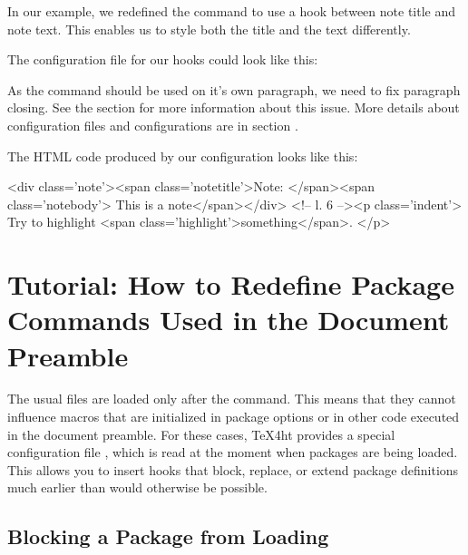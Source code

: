 In our example, we redefined the  command to use a hook between note title
and note text. This enables us to style both the title and the text differently.


The configuration file for our hooks could look like this:

\begin{texsource}
{\ifvmode\IgnorePar\fi\EndP{}}
{}
{}


\EndPreamble
\end{texsource}

As the  command should be used on it's own paragraph, we need to 
fix paragraph closing. See the  section for
more information about this issue. More details about configuration files and configurations are
in section .

The HTML code produced by our configuration looks like this:

\begin{htmlsource}
<div class='note'><span class='notetitle'>Note: </span><span class='notebody'> This is a note</span></div>
<!--  l. 6  --><p class='indent'>   Try to highlight <span class='highlight'>something</span>.
</p>
\end{htmlsource}

\section{Tutorial: How to Redefine Package Commands Used in the Document Preamble}

The usual  files are loaded only after the \verb||
command. This means that they cannot influence macros that are initialized in
package options or in other code executed in the document preamble. For these
cases, \TeX4ht provides a special configuration file ,
which is read at the moment when packages are being loaded. This allows you to
insert hooks that block, replace, or extend package definitions much earlier
than would otherwise be possible.

\subsection{Blocking a Package from Loading}

